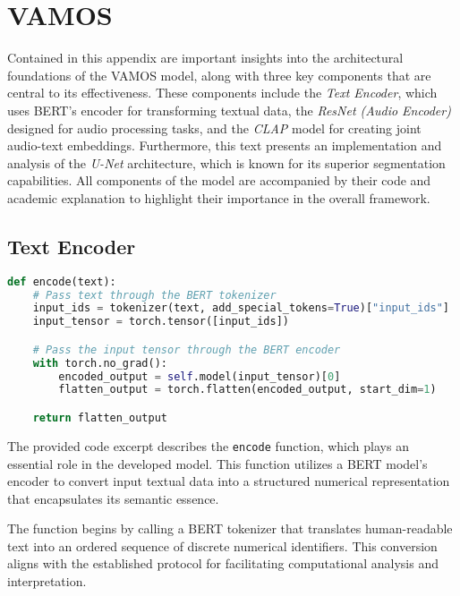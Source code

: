 \chapter{VAMOS} \label{ann:vamos}

Contained in this appendix are important insights into the architectural foundations of the VAMOS model, along with three key components that are central to its effectiveness. These components include the \textit{Text Encoder}, which uses BERT's encoder for transforming textual data, the \textit{ResNet (Audio Encoder)} designed for audio processing tasks, and the \textit{CLAP} model for creating joint audio-text embeddings. Furthermore, this text presents an implementation and analysis of the \textit{U-Net} architecture, which is known for its superior segmentation capabilities. All components of the model are accompanied by their code and academic explanation to highlight their importance in the overall framework.

\section{Text Encoder}

\begin{lstlisting}[language=Python, caption={Text encoding function utilizing BERT tokenizer and encoder for semantic representation extraction.}]
def encode(text):
    # Pass text through the BERT tokenizer
    input_ids = tokenizer(text, add_special_tokens=True)["input_ids"]
    input_tensor = torch.tensor([input_ids])

    # Pass the input tensor through the BERT encoder
    with torch.no_grad():
        encoded_output = self.model(input_tensor)[0]
        flatten_output = torch.flatten(encoded_output, start_dim=1)

    return flatten_output
\end{lstlisting}

The provided code excerpt describes the \texttt{encode} function, which plays an essential role in the developed model. This function utilizes a BERT model's encoder to convert input textual data into a structured numerical representation that encapsulates its semantic essence.

The function begins by calling a BERT tokenizer that translates human-readable text into an ordered sequence of discrete numerical identifiers. This conversion aligns with the established protocol for facilitating computational analysis and interpretation.

